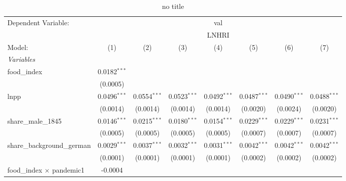 
\begin{table}[htbp]
   \caption{no title}
   \centering
   \begin{tabular}{lccccccc}
      \tabularnewline \midrule \midrule
      Dependent Variable: & \multicolumn{7}{c}{val}\\
       & \multicolumn{7}{c}{LNHRI} \\ 
      Model:                                     & (1)            & (2)            & (3)            & (4)            & (5)            & (6)                    & (7)\\  
      \midrule
      \emph{Variables}\\
      food\_index                                & 0.0182$^{***}$ &                &                &                &                &                        &   \\   
                                                 & (0.0005)       &                &                &                &                &                        &   \\   
      lnpp                                       & 0.0496$^{***}$ & 0.0554$^{***}$ & 0.0523$^{***}$ & 0.0492$^{***}$ & 0.0487$^{***}$ & 0.0490$^{***}$         & 0.0488$^{***}$\\   
                                                 & (0.0014)       & (0.0014)       & (0.0014)       & (0.0014)       & (0.0020)       & (0.0024)               & (0.0020)\\   
      share\_male\_1845                          & 0.0146$^{***}$ & 0.0215$^{***}$ & 0.0180$^{***}$ & 0.0154$^{***}$ & 0.0229$^{***}$ & 0.0229$^{***}$         & 0.0231$^{***}$\\   
                                                 & (0.0005)       & (0.0005)       & (0.0005)       & (0.0005)       & (0.0007)       & (0.0007)               & (0.0007)\\   
      share\_background\_german                  & 0.0029$^{***}$ & 0.0037$^{***}$ & 0.0032$^{***}$ & 0.0031$^{***}$ & 0.0042$^{***}$ & 0.0042$^{***}$         & 0.0042$^{***}$\\   
                                                 & (0.0001)       & (0.0001)       & (0.0001)       & (0.0001)       & (0.0002)       & (0.0002)               & (0.0002)\\   
      food\_index $\times$ pandemic1             & -0.0004        &                &                &                &                &                        &   \\   

\end{tabular}
\end{table}
